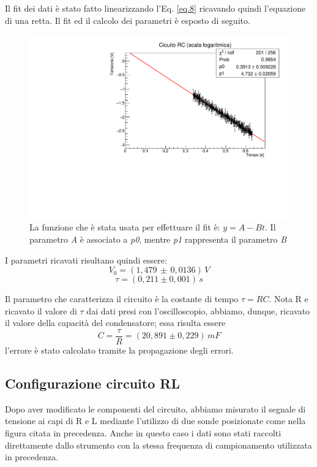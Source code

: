 Il fit dei dati è stato fatto linearizzando l'Eq. \ref{eq.8} ricavando quindi l'equazione di una retta. Il fit ed il calcolo dei parametri è esposto di seguito.
\begin{figure}[h!]
    \centering
    \includegraphics[scale=.4]{Immagini/CircuitoRC_logScale.pdf}
    \caption{La funzione che è stata usata per effettuare il fit è: $y=A-Bt$. Il parametro \textit{A} è associato a \textit{p0}, mentre \textit{p1} rappresenta il parametro \textit{B}}
    \label{fig: RC log scale}
\end{figure}
I parametri ricavati risultano quindi essere:
$$
V_0 = (1,479\,\pm\, 0,0136)\,V %
$$
$$
\tau = (0,211 \pm 0,001)\,s
$$

Il parametro che caratterizza il circuito è la costante di tempo $\tau=RC$. Nota R e ricavato il valore di $\tau$ dai dati presi con l'oscilloscopio, abbiamo, dunque, ricavato il valore della capacità del condensatore; essa risulta essere 
$$
C=\dfrac{\tau}{R} = (20,891\pm 0,229)\,mF
$$
l'errore è stato calcolato tramite la propagazione degli errori. 

\subsection{Configurazione circuito RL}

Dopo aver modificato le componenti del circuito, abbiamo misurato il segnale di tensione ai capi di R e L mediante l'utilizzo di due sonde posizionate come nella figura citata in precedenza. Anche in questo caso i dati sono stati raccolti direttamente dallo strumento con la stessa frequenza di campionamento utilizzata in precedenza.

